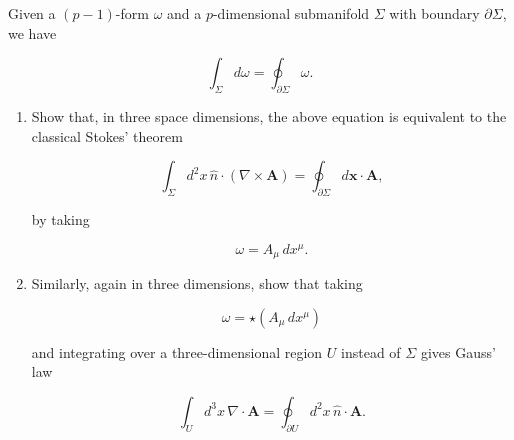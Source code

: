 \begin{Problem}

Given a $(p-1)$-form $\omega$ and a $p$-dimensional submanifold $\Sigma$ with boundary $\partial\Sigma$, we have

\[
\int_\Sigma d\omega
=
\oint_{\partial\Sigma}\omega.
\]

\begin{enumerate}

\item[(a)] Show that, in three space dimensions, the above equation is equivalent to the classical Stokes' theorem

\[
\int_\Sigma
d^2x\,
\hat n\cdot(\nabla\times\mathbf A)
=
\oint_{\partial\Sigma}
d\mathbf x\cdot\mathbf A,
\]

by taking

\[
\omega=A_\mu\,dx^\mu.
\]

\item[(b)] Similarly, again in three dimensions, show that taking

\[
\omega=\star(A_\mu\,dx^\mu)
\]

and integrating over a three-dimensional region $U$ instead of $\Sigma$ gives Gauss' law

\[
\int_U
d^3x\,
\nabla\cdot\mathbf A
=
\oint_{\partial U}
d^2x\,
\hat n\cdot\mathbf A.
\]

\end{enumerate}

\end{Problem}
